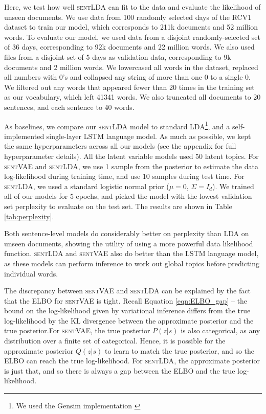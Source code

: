 Here, we test how well \textsc{sentLDA} can fit to the data and evaluate the likelihood of unseen documents. We use data from 100 randomly selected days of the RCV1 dataset to train our model, which corresponds to 211k documents and 52 million words. To evaluate our model, we used data from a disjoint randomly-selected set of 36 days, corresponding to 92k documents and 22 million words. We also used files from a disjoint set of 5 days as validation data, corresponding to 9k documents and 2 million words. We lowercased all words in the dataset, replaced all numbers with 0's and collapsed any string of more than one 0 to a single 0. We filtered out any words that appeared fewer than 20 times in the training set as our vocabulary, which left 41341 words. We also truncated all documents to 20 sentences, and each sentence to 40 words.

As baselines, we compare our \textsc{sentLDA} model to standard LDA\footnote{We used the Gensim implementation \citep{gensim}}, and a self-implemented single-layer LSTM language model. As much as possible, we kept the same hyperparameters across all our models (see the appendix for full hyperparameter details). All the latent variable models used 50 latent topics. For \textsc{sentVAE} and \textsc{sentLDA}, we use 1 sample from the posterior to estimate the data log-likelihood during training time, and use 10 samples during test time. For \textsc{sentLDA}, we used a standard logistic normal prior ($\mu = 0$, $\Sigma=I_d$). We trained all of our models for 5 epochs, and picked the model with the lowest validation set perplexity to evaluate on the test set. The results are shown in Table \ref{tab:perplexity}.

Both sentence-level models do considerably better on perplexity than LDA on unseen documents, showing the utility of using a more powerful data likelihood function. \textsc{sentLDA} and \textsc{sentVAE} also do better than the LSTM language model, as these models can perform inference to work out global topics before predicting individual words.

The discrepancy between \textsc{sentVAE} and \textsc{sentLDA} can be explained by the fact that the ELBO for \textsc{sentVAE} is tight. Recall Equation \ref{eqn:ELBO_gap} -- the bound on the log-likelihood given by variational inference differs from the true log-likelihood by the KL divergence between the approximate posterior and the true posterior.For \textsc{sentVAE}, the true posterior $P(z | s)$ is also categorical, as any distribution over a finite set of categorical. Hence, it is possible for the approximate posterior $Q(z | s)$ to learn to match the true posterior, and so the ELBO can reach the true log-likelihood. For \textsc{sentLDA}, the approximate posterior is just that, and so there is always a gap between the ELBO and the true log-likelihood.

